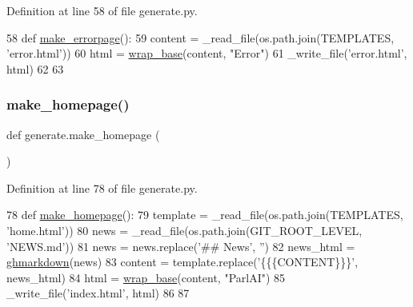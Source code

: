 Definition at line 58 of file generate.\+py.


\begin{DoxyCode}
58 \textcolor{keyword}{def }\hyperlink{namespacegenerate_a1c52bc54613c3a13c908bc65d7911b8e}{make\_errorpage}():
59     content = \_read\_file(os.path.join(TEMPLATES, \textcolor{stringliteral}{'error.html'}))
60     html = \hyperlink{namespacegenerate_adb990cdb948e21150b35af85d236b6be}{wrap\_base}(content, \textcolor{stringliteral}{"Error"})
61     \_write\_file(\textcolor{stringliteral}{'error.html'}, html)
62 
63 
\end{DoxyCode}
\mbox{\label{namespacegenerate_acffbc7c203626a1f396da4a96a2d448d}} 
\subsubsection{\texorpdfstring{make\+\_\+homepage()}{make\_homepage()}}
{\footnotesize\ttfamily def generate.\+make\+\_\+homepage (\begin{DoxyParamCaption}{ }\end{DoxyParamCaption})}



Definition at line 78 of file generate.\+py.


\begin{DoxyCode}
78 \textcolor{keyword}{def }\hyperlink{namespacegenerate_acffbc7c203626a1f396da4a96a2d448d}{make\_homepage}():
79     template = \_read\_file(os.path.join(TEMPLATES, \textcolor{stringliteral}{'home.html'}))
80     news = \_read\_file(os.path.join(GIT\_ROOT\_LEVEL, \textcolor{stringliteral}{'NEWS.md'}))
81     news = news.replace(\textcolor{stringliteral}{'## News'}, \textcolor{stringliteral}{''})
82     news\_html = \hyperlink{namespacegenerate_a7811fd26fa2e3aeec0e3d3851cdda546}{ghmarkdown}(news)
83     content = template.replace(\textcolor{stringliteral}{'\{\{\{CONTENT\}\}\}'}, news\_html)
84     html = \hyperlink{namespacegenerate_adb990cdb948e21150b35af85d236b6be}{wrap\_base}(content, \textcolor{stringliteral}{"ParlAI"})
85     \_write\_file(\textcolor{stringliteral}{'index.html'}, html)
86 
87 
\end{DoxyCode}
\mbox{\label{namespacegenerate_a7e834fd25099e451f5809b35df4ef10d}} 
